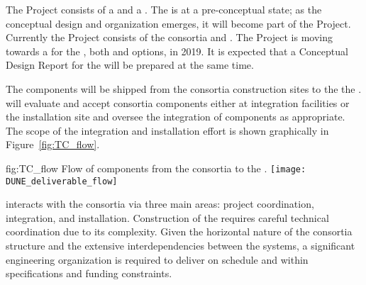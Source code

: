 The  Project consists of a  and a
. The  is at a pre-conceptual state; as the
conceptual design and organization emerges, it will become part of the
 Project. Currently the  Project consists of
the   consortia and .  The
 Project is moving towards a  for
the , both \single and \dual options, in 2019. It is
expected that a Conceptual Design Report for the  will be
prepared at the same time. 

The  components will be shipped
from the consortia construction sites to the the . 
 will
evaluate and accept consortia components either at integration
facilities or the installation site and oversee the integration of
components as appropriate. The scope of the  integration
and installation effort is shown graphically in
Figure~\ref{fig:TC_flow}.

\begin{dunefigure}{fig:TC_flow}
  {Flow of components from the consortia to the .}
 \texttt{[image: DUNE\_deliverable\_flow]}
\end{dunefigure}

 interacts with the consortia via three main areas: project
coordination, integration, and installation.  Construction of the
  requires careful technical coordination due to
its complexity.  Given the horizontal nature of the consortia
structure and the extensive interdependencies between the systems, a
significant engineering organization is required to deliver
 on schedule and within specifications and funding
constraints.

